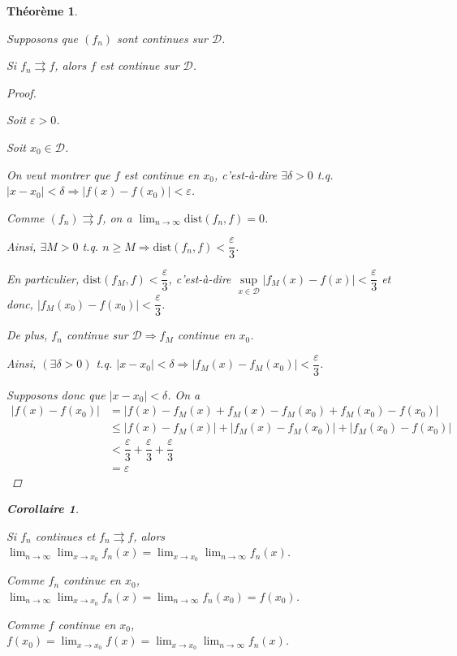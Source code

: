 \documentclass{report}
\newcommand*{\dlim}[3]{\displaystyle\lim_{#1 \to #2}#3}
\newcommand*{\abs}[1]{\left| #1 \right|}
\newcommand*{\convuni}{\rightrightarrows}
\newcommand*{\eps}{\varepsilon}
\newcommand*{\lte}{\leqslant}
\newcommand*{\gte}{\geqslant}
\newtheorem*{thm}{Th\'eor\`eme}
\newtheorem*{coro}{Corollaire}
\theoremstyle{definition}
\theoremstyle{remark}
\begin{document}
	\begin{thm}
		~

		Supposons que $(f_n)$ sont continues sur $\mathcal{D}$.

		Si $f_n \convuni f$, alors $f$ est continue sur $\mathcal{D}$.
		\begin{proof}~

			Soit $\eps>0$.

			Soit $x_0 \in \mathcal{D}$.

			On veut montrer que $f$ est continue en $x_0$, c'est-\`a-dire $\exists\delta>0$ t.q. $\abs{x-x_0}<\delta \Rightarrow \abs{f(x)-f(x_0)}<\eps$.

			Comme $(f_n) \convuni f$, on a $\dlim{n}{\infty}{\mathrm{dist}(f_n,f)}=0$.

			Ainsi, $\exists M>0$ t.q. $n \gte M \Rightarrow \mathrm{dist}(f_n,f) < \dfrac{\eps}{3}$.

			En particulier, $\mathrm{dist}(f_M,f) < \dfrac{\eps}{3}$, c'est-\`a-dire $\sup\limits_{x \in \mathcal{D}}\abs{f_M(x)-f(x)} < \dfrac{\eps}{3}$ et donc, $\abs{f_M(x_0)-f(x_0)} < \dfrac{\eps}{3}$.

			De plus, $f_n$ continue sur $\mathcal{D} \Rightarrow f_M$ continue en $x_0$.

			Ainsi, $(\exists\delta>0)$ t.q. $\abs{x-x_0} < \delta \Rightarrow \abs{f_M(x)-f_M(x_0)} < \dfrac{\eps}{3}$.

			Supposons donc que $\abs{x-x_0} < \delta$. On a
			\begin{align*}
				\abs{f(x)-f(x_0)}&= \abs{f(x) - f_M(x) + f_M(x) - f_M(x_0) + f_M(x_0) - f(x_0)}\\
				&\lte \abs{f(x)-f_M(x)} + \abs{f_M(x)-f_M(x_0)} + \abs{f_M(x_0)-f(x_0)}\\
				&< \dfrac{\eps}{3} + \dfrac{\eps}{3} + \dfrac{\eps}{3}\\
				&= \eps
			\end{align*}
		\end{proof}
		\begin{coro}
			~

			Si $f_n$ continues et $f_n \convuni f$, alors $\dlim{n}{\infty}{\dlim{x}{x_0}{f_n(x)}} = \dlim{x}{x_0}{\dlim{n}{\infty}{f_n(x)}}$.

			Comme $f_n$ continue en $x_0$, $\dlim{n}{\infty}{\dlim{x}{x_0}{f_n(x)}} = \dlim{n}{\infty}{f_n(x_0)} = f(x_0)$.

			Comme $f$ continue en $x_0$, $f(x_0) = \dlim{x}{x_0}{f(x)} = \dlim{x}{x_0}{\dlim{n}{\infty}{f_n(x)}}$.
		\end{coro}
	\end{thm}
\end{document}
